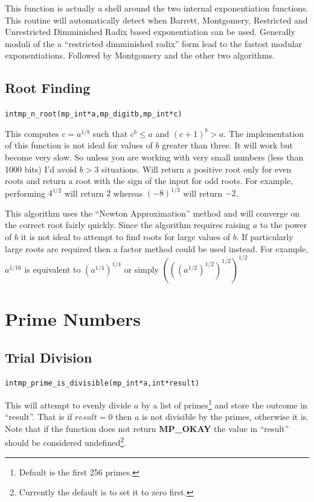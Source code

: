 \documentclass[synpaper]{book}
\begin{document}
This function is actually a shell around the two internal exponentiation functions.  This routine will automatically
detect when Barrett, Montgomery, Restricted and Unrestricted Dimminished Radix based exponentiation can be used.  Generally
moduli of the a ``restricted dimminished radix'' form lead to the fastest modular exponentiations.  Followed by Montgomery
and the other two algorithms.

\section{Root Finding}
\begin{alltt}
int mp_n_root (mp_int * a, mp_digit b, mp_int * c)
\end{alltt}
This computes $c = a^{1/b}$ such that $c^b \le a$ and $(c+1)^b > a$.  The implementation of this function is not 
ideal for values of $b$ greater than three.  It will work but become very slow.  So unless you are working with very small
numbers (less than 1000 bits) I'd avoid $b > 3$ situations.  Will return a positive root only for even roots and return
a root with the sign of the input for odd roots.  For example, performing $4^{1/2}$ will return $2$ whereas $(-8)^{1/3}$ 
will return $-2$.  

This algorithm uses the ``Newton Approximation'' method and will converge on the correct root fairly quickly.  Since
the algorithm requires raising $a$ to the power of $b$ it is not ideal to attempt to find roots for large
values of $b$.  If particularly large roots are required then a factor method could be used instead.  For example,
$a^{1/16}$ is equivalent to $\left (a^{1/4} \right)^{1/4}$ or simply 
$\left ( \left ( \left ( a^{1/2} \right )^{1/2} \right )^{1/2} \right )^{1/2}$

\chapter{Prime Numbers}
\section{Trial Division}
\begin{alltt}
int mp_prime_is_divisible (mp_int * a, int *result)
\end{alltt}
This will attempt to evenly divide $a$ by a list of primes\footnote{Default is the first 256 primes.} and store the 
outcome in ``result''.  That is if $result = 0$ then $a$ is not divisible by the primes, otherwise it is.  Note that 
if the function does not return \textbf{MP\_OKAY} the value in ``result'' should be considered undefined\footnote{Currently
the default is to set it to zero first.}.
\end{document}
